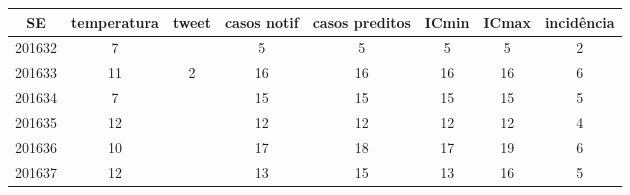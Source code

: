 \begin{tabular}{c|ccccccc}
  \hline
SE & temperatura & tweet & casos notif & casos preditos & ICmin & ICmax & incidência \\ 
  \hline
201632 & 7 &  & 5 & 5 & 5 & 5 & 2 \\ 
  201633 & 11 & 2 & 16 & 16 & 16 & 16 & 6 \\ 
  201634 & 7 &  & 15 & 15 & 15 & 15 & 5 \\ 
  201635 & 12 &  & 12 & 12 & 12 & 12 & 4 \\ 
  201636 & 10 &  & 17 & 18 & 17 & 19 & 6 \\ 
  201637 & 12 &  & 13 & 15 & 13 & 16 & 5 \\ 
   \hline
\end{tabular}
